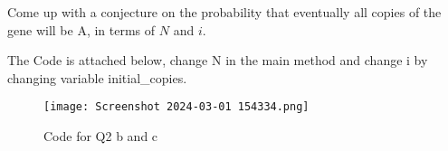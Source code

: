 \documentclass[oneside,12pt]{memoir}
\begin{document}
\begin{enumerate}[leftmargin=*]
\begin{enumerate}
		Come up with a conjecture on the probability that eventually all copies of the gene will be A, in terms of $N$ and $i$.

        The Code is attached below, change N in the main method and change i by changing variable initial\_copies.
	\end{enumerate}
\end{enumerate}
\begin{figure}
    \centering
    \texttt{[image: Screenshot 2024-03-01 154334.png]}
    \caption{Code for Q2 b and c}
    \label{fig:enter-label}
\end{figure}
\end{document}
